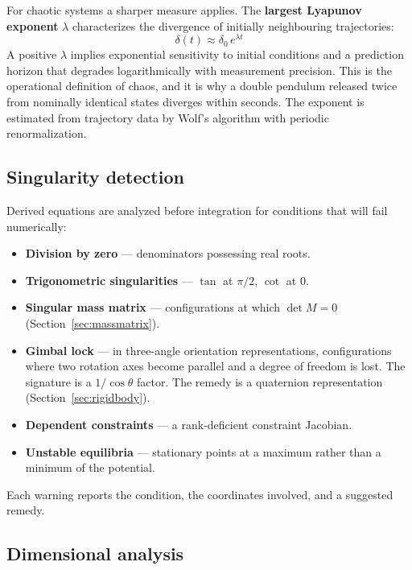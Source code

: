 \documentclass[11pt,a4paper]{article}
\begin{document}
For chaotic systems a sharper measure applies. The \textbf{largest Lyapunov exponent} $\lambda$
characterizes the divergence of initially neighbouring trajectories:
\begin{equation}
\delta(t) \approx \delta_0\, e^{\lambda t}
\end{equation}
A positive $\lambda$ implies exponential sensitivity to initial conditions and a prediction horizon
that degrades logarithmically with measurement precision. This is the operational definition of
chaos, and it is why a double pendulum released twice from nominally identical states diverges within
seconds. The exponent is estimated from trajectory data by Wolf's algorithm with periodic
renormalization.

\subsection{Singularity detection}

Derived equations are analyzed before integration for conditions that will fail numerically:

\begin{itemize}[leftmargin=1.4em,itemsep=0.25em]
  \item \textbf{Division by zero} --- denominators possessing real roots.
  \item \textbf{Trigonometric singularities} --- $\tan$ at $\pi/2$, $\cot$ at $0$.
  \item \textbf{Singular mass matrix} --- configurations at which $\det M = 0$
        (Section~\ref{sec:massmatrix}).
  \item \textbf{Gimbal lock} --- in three-angle orientation representations, configurations where two
        rotation axes become parallel and a degree of freedom is lost. The signature is a
        $1/\cos\theta$ factor. The remedy is a quaternion representation
        (Section~\ref{sec:rigidbody}).
  \item \textbf{Dependent constraints} --- a rank-deficient constraint Jacobian.
  \item \textbf{Unstable equilibria} --- stationary points at a maximum rather than a minimum of the
        potential.
\end{itemize}

Each warning reports the condition, the coordinates involved, and a suggested remedy.

\subsection{Dimensional analysis}
\end{document}
